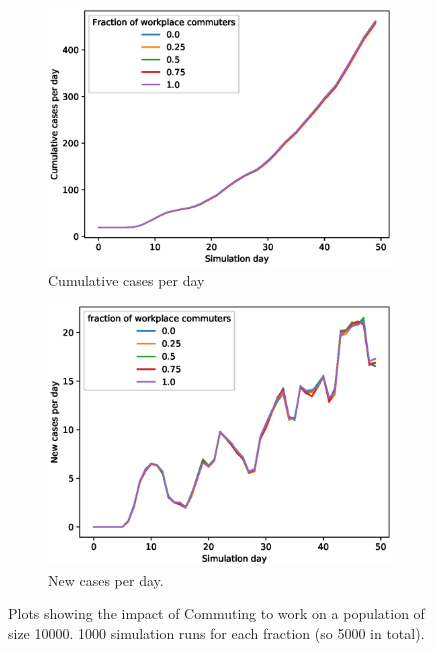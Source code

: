 \documentclass[runningheads]{llncs}
\begin{document}
\begin{figure}[h!]
	\centering
	\begin{subfigure}[b]{0.7\linewidth}
		\includegraphics[width=\textwidth]{work_cum_1.eps}
		\caption{Cumulative cases per day} 
	\end{subfigure}
	\begin{subfigure}[b]{0.7\linewidth}
		\includegraphics[width=\textwidth]{work_cases_per_day_1.eps}
		\caption{New cases per day.} 
	\end{subfigure}
	\caption{Plots showing the impact of Commuting to work on a population of size 10000. 1000 simulation runs for each fraction (so 5000 in total). }
	\label{fig:WorkCommuting0}
\end{figure}
\end{document}
